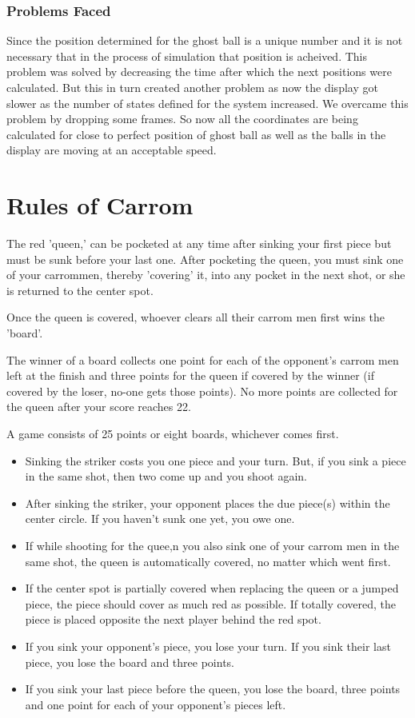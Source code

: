 \documentclass[11pt,a4paper,oneside]{report}
\begin{document}
\subsubsection{Problems Faced}
Since the position determined for the ghost ball is a unique number and it is not necessary that in the process of simulation that position is acheived. This problem was solved by decreasing the time after which the next positions were calculated. But this in turn created another problem as now the display got slower as the number of states defined for the system increased. We overcame this problem by dropping some frames. So now all the coordinates are being calculated for close to perfect position of ghost ball as well as the balls in the display are moving at an acceptable speed.
\section{Rules of Carrom}
The red 'queen,' can be pocketed at any time after sinking your first piece but must be sunk before your last one. After pocketing the queen, you must sink one of your carrommen, thereby 'covering' it, into any pocket in the next shot, or she is returned to the center spot.

Once the queen is covered, whoever clears all their carrom men first wins the 'board'.

The winner of a board collects one point for each of the opponent's carrom men left at the finish and three points for the queen if covered by the winner (if covered by the loser, no-one gets those points). No more points are collected for the queen after your score reaches 22.

A game consists of 25 points or eight boards, whichever comes first.
\begin{itemize}
    \item{Sinking the striker costs you one piece and your turn. But, if you sink a piece in the same shot, then two come up and you shoot again.}

    \item{After sinking the striker, your opponent places the due piece(s) within the center circle. If you haven't sunk one yet, you owe one.}

    \item{If while shooting for the quee,n you also sink one of your carrom men in the same shot, the queen is automatically covered, no matter which went first.}

    \item{If the center spot is partially covered when replacing the queen or a jumped piece, the piece should cover as much red as possible. If totally covered, the piece is placed opposite the next player behind the red spot.}

    \item{If you sink your opponent's piece, you lose your turn. If you sink their last piece, you lose the board and three points.}

    \item{If you sink your last piece before the queen, you lose the board, three points and one point for each of your opponent's pieces left.}

\end{itemize}
\end{document}

